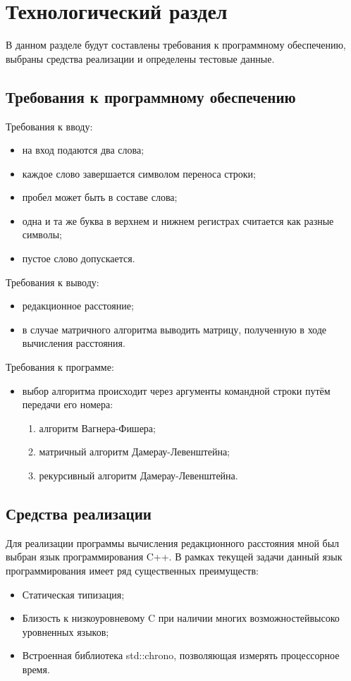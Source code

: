 \chapter{Технологический раздел}
\label{cha:impl}

В данном разделе будут составлены требования к программному обеспечению, выбраны средства реализации и определены тестовые данные.

\section{Требования к программному обеспечению}
Требования к вводу:
\begin{itemize}
    \item на вход подаются два слова;
    \item каждое слово завершается символом переноса строки;
    \item пробел может быть в составе слова;
    \item одна и та же буква в верхнем и нижнем регистрах считается как разные символы;
    \item пустое слово допускается.
\end{itemize}
Требования к выводу:
\begin{itemize}
    \item редакционное расстояние;
    \item в случае матричного алгоритма выводить матрицу, полученную в ходе вычисления расстояния.
\end{itemize}
Требования к программе:
\begin{itemize}
    \item выбор алгоритма происходит через аргументы командной строки путём передачи его номера:
        \begin{enumerate}[1)]
            \item алгоритм Вагнера-Фишера;
            \item матричный алгоритм Дамерау-Левенштейна;
            \item рекурсивный алгоритм Дамерау-Левенштейна.
        \end{enumerate}

\end{itemize}

\section{Средства реализации}
Для реализации программы вычисления редакционного расстояния мной был выбран язык программирования C++. В рамках текущей задачи данный язык программирования имеет ряд существенных преимуществ:
\begin{itemize}
    \item Статическая типизация;
    \item Близость к низкоуровневому C при наличии многих возможностейвысоко уровненных языков;
    \item Встроенная библиотека std::chrono, позволяющая измерять процессорное время.
\end{itemize}

